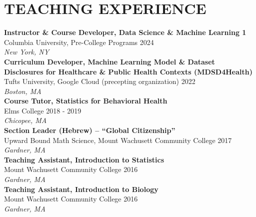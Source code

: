 \documentclass[a4paper,12pt]{article}
\begin{document}
{\section*{TEACHING EXPERIENCE}
\textbf{Instructor \& Course Developer, Data Science \& Machine Learning 1} \\
Columbia University, Pre-College Programs \hfill 2024 \\
\textit{New York, NY}
\vspace{1em}
\\
\textbf{Curriculum Developer, Machine Learning Model \& Dataset Disclosures for Healthcare \& Public Health Contexts (MDSD4Health)} \\
Tufts University, Google Cloud (precepting organization) \hfill 2022 \\
\textit{Boston, MA}
\vspace{1em}
\\
\textbf{Course Tutor, Statistics for Behavioral Health} \\
Elms College \hfill 2018 - 2019 \\
\textit{Chicopee, MA}
\vspace{1em}
\\
\textbf{Section Leader (Hebrew) – “Global Citizenship”} \\
Upward Bound Math Science, Mount Wachusett Community College \hfill 2017 \\
\textit{Gardner, MA}
\vspace{1em}
\\
\textbf{Teaching Assistant, Introduction to Statistics} \\
Mount Wachusett Community College \hfill 2016 \\
\textit{Gardner, MA}
\vspace{1em}
\\
\textbf{Teaching Assistant, Introduction to Biology} \\
Mount Wachusett Community College \hfill 2016 \\
\textit{Gardner, MA}
\vspace{1em}

}
\end{document}
